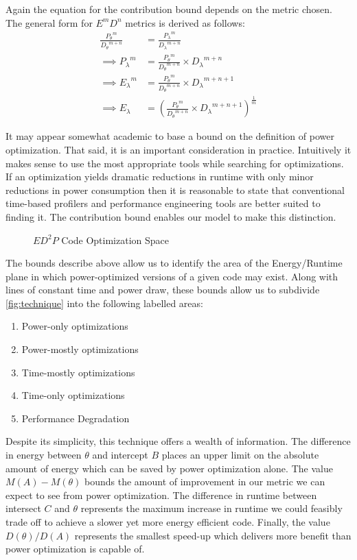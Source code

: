 Again the equation for the contribution bound depends on the metric chosen.
The general form for $E^mD^n$ metrics is derived as follows:
\begin{align}
\frac{{P_{\theta}}^m}{{D_{\theta}}^{m+n}} &= \frac{{P_{\lambda}}^m}{{D_{\lambda}}^{m+n}} \nonumber \\
\implies {P_{\lambda}}^m &= \frac{{P_{\theta}}^m}{{D_{\theta}}^{m+n}} \times {D_\lambda}^{m+n} \nonumber \\ 
\implies {E_{\lambda}}^m &= \frac{{P_{\theta}}^m}{{D_{\theta}}^{m+n}} \times {D_\lambda}^{m+n+1} \nonumber \\ 
\implies E_{\lambda} &= (\frac{{P_{\theta}}^m}{{D_{\theta}}^{m+n}} \times {D_\lambda}^{m+n+1})^{\frac{1}{m}} 
\end{align}

It may appear somewhat academic to base a bound on the definition of power optimization. That said, it is an important consideration in practice. Intuitively it makes sense to use the most appropriate tools while searching for optimizations.  If an optimization yields dramatic reductions in runtime with only minor reductions in power consumption then it is reasonable to state that conventional time-based profilers and performance engineering tools are better suited to finding it. The contribution bound enables our model to make this distinction.

\begin{figure}
\centering

\caption{$ED^2P$ Code Optimization Space}
\label{fig:technique}
\end{figure}
The bounds describe above allow us to identify the area of the Energy/Runtime plane in which power-optimized versions of a given code may exist. 
Along with lines of constant time and power draw, these bounds allow us to subdivide \autoref{fig:technique} into the following labelled areas:
\begin{enumerate}
\item Power-only optimizations
\item Power-mostly optimizations
\item Time-mostly optimizations
\item Time-only optimizations
\item Performance Degradation
\end{enumerate}


Despite its simplicity, this technique offers a wealth of information. The difference in energy between $\theta$ and intercept $B$ places an upper limit on the absolute amount of energy which can be saved by power optimization alone. The value $M(A) - M(\theta)$ bounds the amount of improvement in our metric we can expect to see from power optimization. The difference in runtime between intersect $C$ and $\theta$ represents the maximum increase in runtime we could feasibly trade off to achieve a slower yet more energy efficient code. Finally, the value $D(\theta) / D(A)$ represents the smallest speed-up which delivers more benefit than power optimization is capable of.

